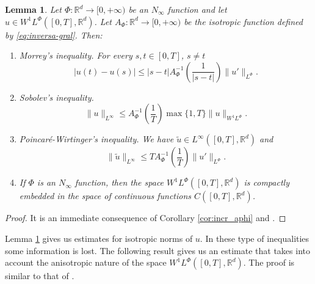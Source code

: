 \documentclass[twoside]{article}
\newtheorem{lem}[thm]{Lemma}
\theoremstyle{remark}
\newcommand{\orlnor}{\|_{L^{\Phi}}}
\newcommand{\linf}{\|_{L^{\infty}}}
\newcommand{\lphi}{L^{\Phi}}
\newcommand{\wphi}{W^{1}\lphi}
\newcommand{\sobnor}{\|_{W^{1}\lphi}}
\newcommand{\rr}{\mathbb{R}}
\renewcommand{\leq}{\leqslant}
\begin{document}
\begin{lem}\label{lem:inclusion orlicz} Let $\Phi:\rr^d\to [0,+\infty)$ be an $N_{\infty}$
function and let \linebreak[4]$u\in\wphi\left([0,T],\rr^d\right)$. Let 
$A_{\Phi}: \rr^d \to  [0,+\infty)$ be the isotropic function defined by \eqref{eq:inversa-gral}. Then:
 
\begin{enumerate}
  \item \emph{Morrey's inequality}.   For every $s,t\in [0,T]$, $s\neq t$
  \begin{equation}
   |u(t)-u(s)| \leq
  |s-t|A_{\Phi}^{-1}\left(\frac{1}{|s-t|}\right)\|u'\orlnor.\tag{M.I}\label{in-sob-cont}
  \end{equation}

  \item \emph{Sobolev's inequality}. 
  \begin{equation}
   \|u\linf \leq A_\Phi^{-1}\left(\frac{1}{T}\right)\max\{1,T\}\|u\sobnor.\tag{S.I}\label{eq:sobolev}
  \end{equation}

  \item \emph{Poincar\'e-Wirtinger's inequality}. We have $\widetilde{u}\in L^{\infty}\left([0,T],\rr^d\right)$ and 
    \begin{equation}\label{eq:wirtinger-iso}
    \|\widetilde{u}\|_{L^{\infty}} \leq T A_{\Phi}^{-1}\left(\frac{1}{T}\right)\| u'\orlnor.\tag{P-W.I}
    \end{equation}
    
    \item\label{it:embeding} If $\Phi$ is an $N_{\infty}$ function, then the space $\wphi\left([0,T],\rr^d\right)$ is compactly embedded in the space of  continuous functions $C([0,T],\rr^d)$.
  \end{enumerate}

\end{lem}

\begin{proof}  It is an immediate consequence of Corollary \ref{cor:incr_aphi} and \cite[Lemma 2.1, Cor. 2.2]{ABGMS2015}.
\end{proof}

Lemma \ref{lem:inclusion orlicz} gives us estimates for isotropic norms of $u$. In these type of inequalities some information is lost.  The following result gives us an estimate that takes into account the anisotropic nature of the space $\wphi\left([0,T],\rr^d\right)$. The proof is similar to  that of  \cite[Thm. 4.5]{chamra2017anisotropic}.
\end{document}
